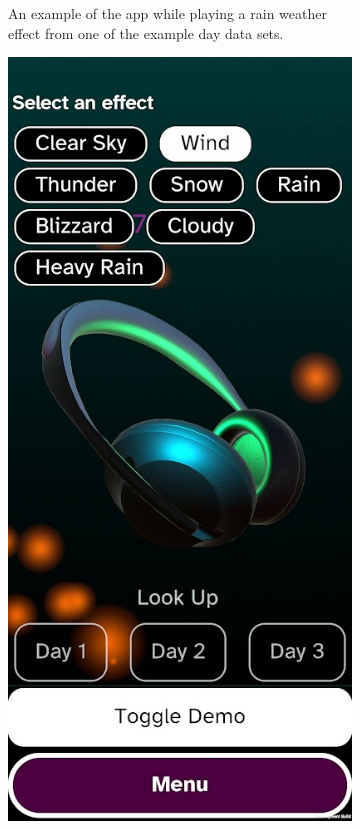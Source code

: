 \documentclass{l4proj}
\begin{document}
\begin{figure}[htb!]
\begin{subfigure}[b]{0.35\textwidth}
        \caption{An example of the app while playing a rain weather effect from one of the example day data sets.}
        \label{fig:syn1}
    \end{subfigure}
    \quad
    \begin{subfigure}[b]{0.35\textwidth}
        \includegraphics[width=\textwidth]{images/demo_screenshot.jpg}

\end{subfigure}
\end{figure}
\end{document}
